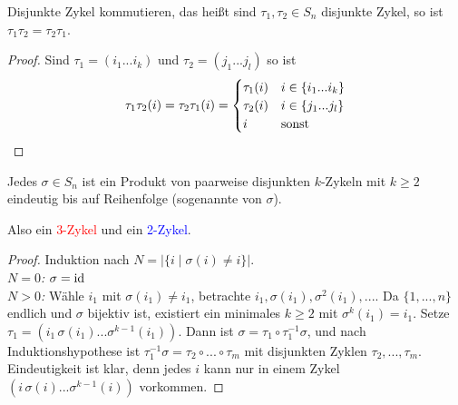 \begin{lemma}
	Disjunkte Zykel kommutieren, das heißt sind $\tau_1,\tau_2\in S_n$ disjunkte Zykel, so ist $\tau_1\tau_2 = \tau_2\tau_1$.
\end{lemma}
\begin{proof}
	Sind $\tau_1=(i_1...i_k)$ und $\tau_2=(j_1...j_l)$ so ist
	\begin{align}
		\tau_1\tau_2(i)=\tau_2\tau_1(i)=\begin{cases}
			\tau_1(i) & i\in\{i_1...i_k\} \\
			\tau_2(i) & i\in\{j_1...j_l\} \\
			i & \text{sonst}
		\end{cases}\notag
	\end{align}
\end{proof}

\begin{proposition}
	Jedes $\sigma\in S_n$ ist ein Produkt von paarweise disjunkten $k$-Zykeln mit $k\ge 2$ eindeutig bis auf Reihenfolge (sogenannte  von $\sigma$). 
	\begin{center}
	\end{center}
	Also ein \textcolor{red}{3-Zykel} und ein \textcolor{blue}{2-Zykel}.
\end{proposition}
\begin{proof}
	Induktion nach $N=\vert \{i\mid \sigma(i)\neq i\}\vert$. \\
	\emph{$N=0$:} $\sigma=\operatorname{id}$ \\
	\emph{$N>0$:} Wähle $i_1$ mit $\sigma(i_1)\neq i_1$, betrachte $i_1,\sigma(i_1),\sigma^2(i_1),...$. Da $\{1,...,n\}$ endlich und $\sigma$ bijektiv ist, existiert ein minimales $k\ge 2$ mit $\sigma^k(i_1)=i_1$. Setze $\tau_1=(i_1\,\sigma(i_1)...\sigma^{k-1}(i_1))$. Dann ist $\sigma=\tau_1\circ\tau_1^{-1}\sigma$, und nach Induktionshypothese ist $\tau_1^{-1}\sigma=\tau_2\circ...\circ\tau_m$ mit disjunkten Zyklen $\tau_2,...,\tau_m$. \\
	Eindeutigkeit ist klar, denn jedes $i$ kann nur in einem Zykel $(i\,\sigma(i)...\sigma^{k-1}(i))$ vorkommen.
\end{proof}

